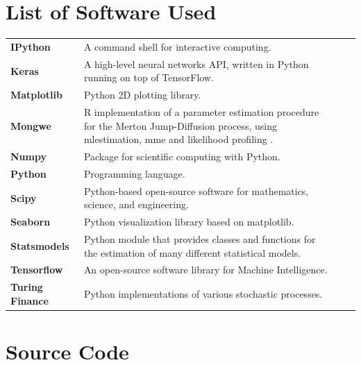 \documentclass[11pt,oneside,openany,a4paper,english, report, goldenblock
]{usthesis}
\begin{document}
\chapter[Appendix D]{List of Software Used}
\label{list_of_software_used}
\def\arraystretch{2}
\begin{tabular}[h]{l p{9cm} ll}
	
	\textbf{IPython} & A command shell for interactive computing. &\cite{ipython} \\ 
	
	\textbf{Keras} & A high-level neural networks API, written in Python running on top of TensorFlow. &\cite{chollet2015keras} \\ 
	
	\textbf{Matplotlib} & Python 2D plotting library. &\cite{matplotlib} \\ 
	
	\textbf{Mongwe} & R implementation of a parameter estimation procedure for the Merton Jump-Diffusion process, using \acrshort{mlestimation}, \acrshort{mme} and likelihood profiling \citep{Honore}. & \cite{Mongwe} \\ 
	
	\textbf{Numpy} & Package for scientific computing with Python. &\cite{numpy} \\ 
	
	\textbf{Python} & Programming language. & \cite{python} \\ 
	
	\textbf{Scipy} & Python-based open-source software for mathematics, science, and engineering. &\cite{scipy} \\ 
	
	\textbf{Seaborn} & Python visualization library based on matplotlib. &\cite{seaborn} \\ 
	
	\textbf{Statsmodels} & Python module that provides classes and functions for the estimation of many different statistical models. &\cite{statsmodels} \\ 
	
	\textbf{Tensorflow} & An open-source software library for Machine Intelligence. & \cite{tensorflow2015-whitepaper} \\ 
	
	\textbf{Turing Finance} & Python implementations of various stochastic processes. & \cite{reid} \\ 
 
\end{tabular} 

\chapter[Appendix E]{Source Code}
\label{appendix:source_code}
\end{document}
